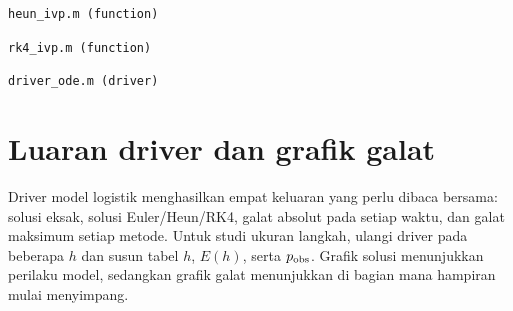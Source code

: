 \documentclass[book,english,noindex,lean,nobackpage,nocopyright,noupdate,nofiglist,notablist]{enacom}
\newcommand{\MatlabFile}[1]{\par\smallskip\noindent\texttt{#1}\par}
\begin{document}
\MatlabFile{heun\_ivp.m (function)}


\MatlabFile{rk4\_ivp.m (function)}


\MatlabFile{driver\_ode.m (driver)}



\section{Luaran driver dan grafik galat}
Driver model logistik menghasilkan empat keluaran yang perlu dibaca bersama: solusi eksak, solusi Euler/Heun/RK4, galat absolut pada setiap waktu, dan galat maksimum setiap metode. Untuk studi ukuran langkah, ulangi driver pada beberapa $h$ dan susun tabel $h$, $E(h)$, serta $p_{\rm obs}$. Grafik solusi menunjukkan perilaku model, sedangkan grafik galat menunjukkan di bagian mana hampiran mulai menyimpang.
\end{document}

